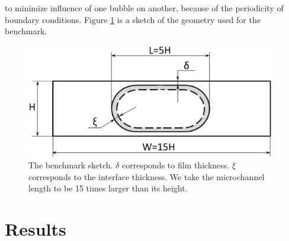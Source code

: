 \documentclass[preprint,12pt]{elsarticle}
\begin{document}
to minimize influence of one bubble on another,
because of the periodicity of boundary conditions.
Figure \ref{fig:benchmark:sketch} is a sketch of the geometry
used for the benchmark.
\begin{figure}
\includegraphics[width=0.97\textwidth]{Figures/benchmark.eps}
\caption{The benchmark sketch. $\delta$ corresponds to film thickness. $\xi$ corresponds to the interface thickness. We take the microchannel length to be 15 times larger than its height.
\label{fig:benchmark:sketch}}
\end{figure}


\section{Results}
\end{document}

